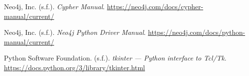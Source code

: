 \documentclass[12pt]{article}
\begin{document}
\begin{list}{}{%
    \setlength{\leftmargin}{1.27cm}
    \setlength{\itemindent}{-1.27cm}
    \setlength{\itemsep}{6pt}
    \setlength{\parsep}{0pt}}
\item Neo4j, Inc. (s.f.). \textit{Cypher Manual}. \url{https://neo4j.com/docs/cypher-manual/current/}
\item Neo4j, Inc. (s.f.). \textit{Neo4j Python Driver Manual}. \url{https://neo4j.com/docs/python-manual/current/}
\item Python Software Foundation. (s.f.). \textit{tkinter — Python interface to Tcl/Tk}. \url{https://docs.python.org/3/library/tkinter.html}
\end{list}
\end{document}
